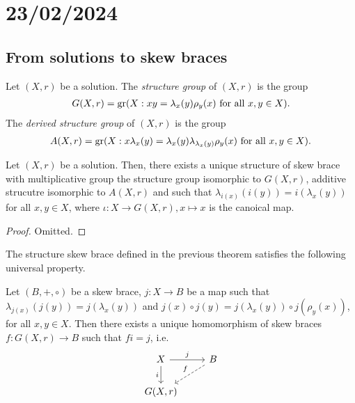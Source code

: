 \section{23/02/2024}

\subsection{From solutions to skew braces}

    \begin{definition}
        Let $(X,r)$ be a solution. The \emph{structure group} of $(X,r)$ is the group
        \begin{align*}
            G(X,r)=\operatorname{gr}(X : xy=\lambda_x(y)\rho_y(x) \text{ for all }x,y\in X).
        \end{align*}
        The \emph{derived structure group} of $(X,r)$ is the group
        \begin{align*} 
            A(X,r)=\operatorname{gr}(X : x\lambda_x(y)=\lambda_x(y)\lambda_{\lambda_x(y)}\rho_y(x) \text{ for all }x,y\in X).
        \end{align*}
    \end{definition}

        
    \begin{theorem}
    Let $(X,r)$ be a solution.
    Then, there exists a unique structure of skew brace with multiplicative group the structure group isomorphic to $G(X,r)$, additive strucutre isomorphic to $A(X,r)$ and such that $\lambda_{i(x)}(i(y))=i(\lambda_x(y))$ for all $x,y\in X$, where $\iota: X\to G(X,r), x\mapsto x$ is the canoical map. 
    \end{theorem}

    \begin{proof}
        Omitted.
    \end{proof}

    The structure skew brace defined in the previous theorem satisfies the following universal property.
    
    \begin{proposition}
        Let $(B,+,\circ)$ be a skew brace, $j\colon X\rightarrow B$ be a map such that $\lambda_{j(x)}(j(y))=j(\lambda_x(y))$ and $j(x)\circ j(y)=j(\lambda_x(y))\circ j(\rho_y(x))$, for all $x,y\in X$. Then there exists a unique homomorphism of skew braces $f\colon G(X,r)\rightarrow B$ such that $fi=j$, i.e.
        \begin{equation*}
        \begin{tikzcd}
            X \arrow[r,"j"] \arrow[d,swap,"i"] &
            B \arrow[dl,swap, dashed,"f"] 
            \\
            G(X,r) 
        \end{tikzcd}
        \end{equation*}
    \end{proposition}

